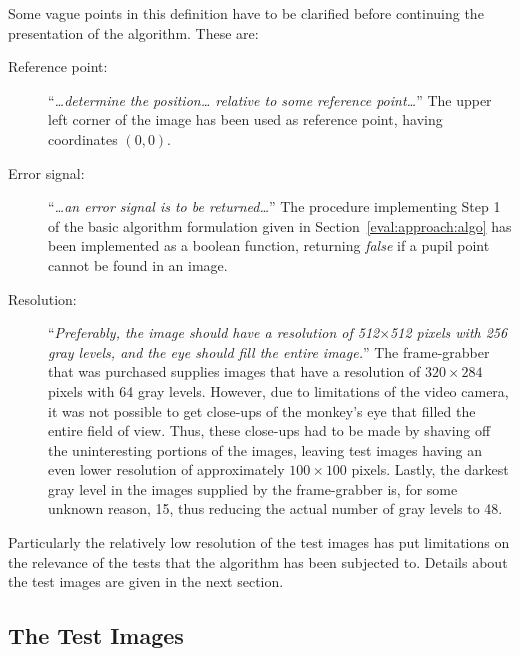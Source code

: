 \noindent Some vague points in this definition have to be clarified
before continuing the presentation of the algorithm.  These are:
\begin{description}
\item[Reference point:] ``{\em\ldots determine the position\ldots
    relative to some reference point\ldots\/}'' The upper left corner
  of the image has been used as reference point, having coordinates
  $(0,0)$.
\item[Error signal:] ``{\em\ldots an error signal is to be
    returned\ldots\/}'' The procedure implementing Step 1 of the basic
  algorithm formulation given in Section~\ref{eval:approach:algo} has
  been implemented as a boolean function, returning {\em false\/} if
  a pupil point cannot be found in an image.
\item[Resolution:] ``{\em Preferably, the image should have a
    resolution of 512$\times$512 pixels with 256 gray levels, and the
    eye should fill the entire image.\/}'' The frame-grabber that was
  purchased supplies images that have a resolution of $320\times 284$
  pixels with 64 gray levels.  However, due to limitations of the
  video camera, it was not possible to get close-ups of the monkey's
  eye that filled the entire field of view.  Thus, these close-ups had
  to be made by shaving off the uninteresting portions of the images,
  leaving test images having an even lower resolution of approximately
  $100\times 100$ pixels.  Lastly, the darkest gray level in the
  images supplied by the frame-grabber is, for some unknown reason,
  15, thus reducing the actual number of gray levels to 48.
\end{description}
Particularly the relatively low resolution of the test images has
put limitations on the relevance of the tests that the algorithm has
been subjected to.  Details about the test images are given in the
next section.

\subsection{The Test Images}
\label{algo:intro:images}

